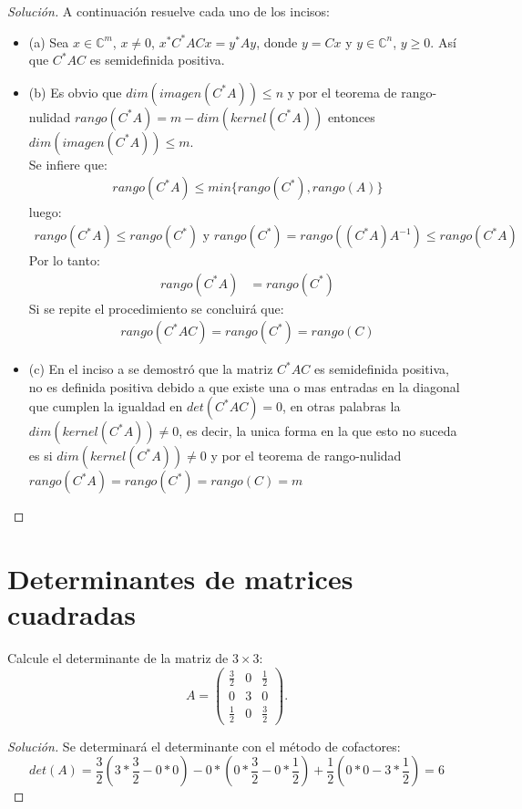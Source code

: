\documentclass[12pt]{book}
\newcommand{\C}{\mathbb{C}}
\newenvironment{solucion}
  {\renewcommand\qedsymbol{$\square$}\begin{proof}[Solución]}
  {\end{proof}}
\begin{document}
\begin{solucion}
A continuación resuelve cada uno de los incisos:
\begin{itemize}
    \item (a) Sea $x\in\C^m$, $x\neq0$, $x^*C^*ACx=y^*Ay$, donde $y=Cx$ y $y\in\C^n$, $y\geq0$. Así que $C^*AC$ es semidefinida positiva.
        \item (b) Es obvio que $dim(imagen(C^*A))\leq n$ y por el teorema de rango-nulidad $rango(C^*A)=m-dim(kernel(C^*A))$ entonces $dim(imagen(C^*A))\leq m$. \\
        Se infiere que: 
        \begin{align*}
            rango(C^*A)\leq min\{rango(C^*),rango(A)\}
        \end{align*}
        luego:
        \begin{align*}
            rango(C^*A)\leq rango(C^*)\textrm{ y } rango(C^*)=rango((C^*A)A^{-1})\leq rango(C^*A)
        \end{align*}
        Por lo tanto:
        \begin{align*}
            rango(C^*A)&=rango(C^*)
        \end{align*}
        Si se repite el procedimiento se concluirá que:
        \begin{align*}
            rango(C^*AC)=rango(C^*)=rango(C)
        \end{align*}
    \item (c) En el inciso a se demostró que la matriz $C^*AC$ es semidefinida positiva, no es definida positiva debido a que existe una o mas entradas en la diagonal que cumplen la igualdad en $det(C^*AC)=0$, en otras palabras la $dim(kernel(C^*A))\neq 0$, es decir, la unica forma en la que esto no suceda es si $dim(kernel(C^*A))\neq 0$ y por el teorema de rango-nulidad $rango(C^*A)=rango(C^*)=rango(C)=m$
\end{itemize}
\end{solucion}

\section{Determinantes de matrices cuadradas}
\eje Calcule el determinante de la matriz de $3\times3$:
    \[
        A=
        \begin{pmatrix}
            \frac{3}{2} & 0 & \frac{1}{2}\\
            0 & 3 & 0\\
            \frac{1}{2} & 0 & \frac{3}{2}
        \end{pmatrix}.
    \]
\begin{solucion}
Se determinará el determinante con el método de cofactores:
    \[
        det(A) =  \frac{3}{2}\left(3*\frac{3}{2}-0*0\right)-0*\left(0*\frac{3}{2}-0*\frac{1}{2}\right)+\frac{1}{2}\left(0*0-3*\frac{1}{2}\right)= 6
    \]
\end{solucion}
\end{document}

